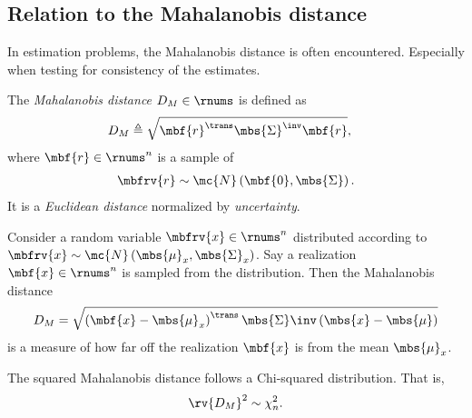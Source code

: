 \subsection{Relation to the Mahalanobis distance}
In estimation problems, the Mahalanobis distance is often encountered. Especially when testing for consistency of the estimates.
\begin{definitionBox}
    The \emph{Mahalanobis distance} $D_{M}\in\rnums$ is defined as 
    \begin{align}
        D_{M} &\triangleq \sqrt{\mbf{r}^{\trans}\mbs{\Sigma}^{\inv}\mbf{r}},
    \end{align}
    where $\mbf{r}\in\rnums^{n}$ is a sample of 
    \begin{align}
        \mbfrv{r} \sim\mc{N}\left( \mbf{0}, \mbs{\Sigma} \right).
    \end{align}
    It is a \emph{Euclidean distance} normalized by \emph{uncertainty}.
\end{definitionBox}
\begin{example}
    Consider a random variable $\mbfrv{x}\in\rnums^{n}$ distributed according to $\mbfrv{x}\sim\mc{N}\left(\mbs{\mu}_{x},\mbs{\Sigma}_{x}\right)$. Say a realization $\mbf{x}\in\rnums^{n}$ is sampled from the distribution. Then the Mahalanobis distance
    \begin{align}
        D_{M} = \sqrt{\left(\mbf{x}-\mbs{\mu}_{x}\right)^{\trans}\mbs{\Sigma}\inv\left( \mbs{x}-\mbs{\mu}\right)}
    \end{align}
    is a measure of how far off the realization $\mbf{x}$ is from the mean $\mbs{\mu}_{x}$.
    \triqed
\end{example}
\begin{mytheorem}   
    The squared Mahalanobis distance follows a Chi-squared distribution. That is, 
    \begin{align}
        \rv{D_{M}}^{2}\sim\chi^{2}_{n}.
    \end{align}
\end{mytheorem}
